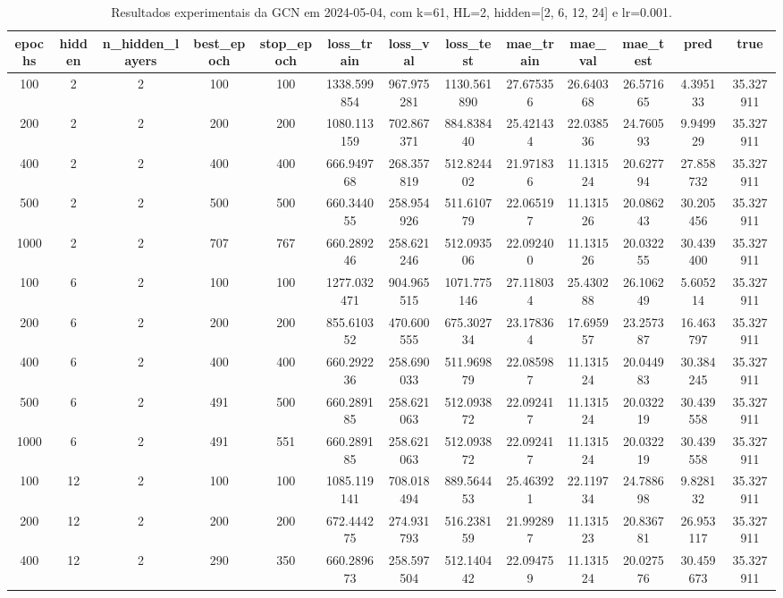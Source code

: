 \begin{table}[h]
\centering
\caption{Resultados experimentais da GCN em 2024-05-04, com k=61, HL=2, hidden=[2, 6, 12, 24] e lr=0.001.}
\label{tab:gcn_results_k61_hl2_d20240504}
\begin{tabular}{ccccccccccccc}
\toprule
epochs & hidden & n\_hidden\_layers & best\_epoch & stop\_epoch & loss\_train & loss\_val & loss\_test & mae\_train & mae\_val & mae\_test & pred & true \\
\midrule
100 & 2 & 2 & 100 & 100 & 1338.599854 & 967.975281 & 1130.561890 & 27.675356 & 26.640368 & 26.571665 & 4.395133 & 35.327911 \\
200 & 2 & 2 & 200 & 200 & 1080.113159 & 702.867371 & 884.838440 & 25.421434 & 22.038536 & 24.760593 & 9.949929 & 35.327911 \\
400 & 2 & 2 & 400 & 400 & 666.949768 & 268.357819 & 512.824402 & 21.971836 & 11.131524 & 20.627794 & 27.858732 & 35.327911 \\
500 & 2 & 2 & 500 & 500 & 660.344055 & 258.954926 & 511.610779 & 22.065197 & 11.131526 & 20.086243 & 30.205456 & 35.327911 \\
1000 & 2 & 2 & 707 & 767 & 660.289246 & 258.621246 & 512.093506 & 22.092400 & 11.131526 & 20.032255 & 30.439400 & 35.327911 \\
100 & 6 & 2 & 100 & 100 & 1277.032471 & 904.965515 & 1071.775146 & 27.118034 & 25.430288 & 26.106249 & 5.605214 & 35.327911 \\
200 & 6 & 2 & 200 & 200 & 855.610352 & 470.600555 & 675.302734 & 23.178364 & 17.695957 & 23.257387 & 16.463797 & 35.327911 \\
400 & 6 & 2 & 400 & 400 & 660.292236 & 258.690033 & 511.969879 & 22.085987 & 11.131524 & 20.044983 & 30.384245 & 35.327911 \\
500 & 6 & 2 & 491 & 500 & 660.289185 & 258.621063 & 512.093872 & 22.092417 & 11.131524 & 20.032219 & 30.439558 & 35.327911 \\
1000 & 6 & 2 & 491 & 551 & 660.289185 & 258.621063 & 512.093872 & 22.092417 & 11.131524 & 20.032219 & 30.439558 & 35.327911 \\
100 & 12 & 2 & 100 & 100 & 1085.119141 & 708.018494 & 889.564453 & 25.463921 & 22.119734 & 24.788698 & 9.828132 & 35.327911 \\
200 & 12 & 2 & 200 & 200 & 672.444275 & 274.931793 & 516.238159 & 21.992897 & 11.131523 & 20.836781 & 26.953117 & 35.327911 \\
400 & 12 & 2 & 290 & 350 & 660.289673 & 258.597504 & 512.140442 & 22.094759 & 11.131524 & 20.027576 & 30.459673 & 35.327911 \\

\end{tabular}
\end{table}
